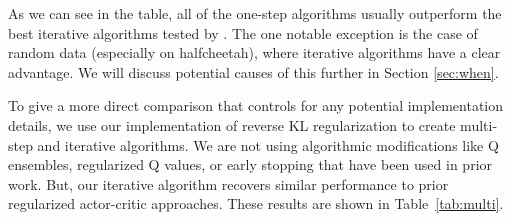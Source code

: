 


As we can see in the table, all of the one-step algorithms usually outperform the best iterative algorithms tested by \citet{fu2020d4rl}.
The one notable exception is the case of random data (especially on halfcheetah), where iterative algorithms have a clear advantage. We will discuss potential causes of this further in Section \ref{sec:when}.

To give a more direct comparison that controls for any potential implementation details, we use our implementation of reverse KL regularization to create multi-step and iterative algorithms. We are not using algorithmic modifications like Q ensembles, regularized Q values, or early stopping that have been used in prior work. But, our iterative algorithm recovers similar performance to prior regularized actor-critic approaches. These results are shown in Table~\ref{tab:multi}.

